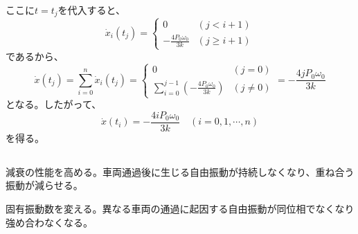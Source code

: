 \documentclass[a4paper]{jsarticle}
\begin{document}
ここに$t = t_j$を代入すると、
\begin{equation}
  \dot{x}_i(t_j) =
  \begin{cases}
    0 & (j < i + 1) \\
    -\frac{4 P_0 \omega_0}{3 k} & (j \geq i + 1)
  \end{cases}
\end{equation}
であるから、
\begin{equation}
  \dot{x}(t_j) = \sum_{i = 0}^n \dot{x}_i(t_j) =
  \begin{cases}
    0 & (j = 0) \\
    \sum_{i = 0}^{j - 1} \left(-\frac{4 P_0 \omega_0}{3 k}\right)
    & (j \neq 0)
  \end{cases}
  = -\frac{4 j P_0 \omega_0}{3 k}
\end{equation}
となる。したがって、
\begin{equation}
  \dot{x}(t_i) = -\frac{4 i P_0 \omega_0}{3 k} \quad (i = 0, 1, \cdots ,n)
\end{equation}
を得る。

\subsection{}
減衰の性能を高める。車両通過後に生じる自由振動が持続しなくなり、重ね合う振動が減らせる。\par
固有振動数を変える。異なる車両の通過に起因する自由振動が同位相でなくなり強め合わなくなる。
\end{document}
